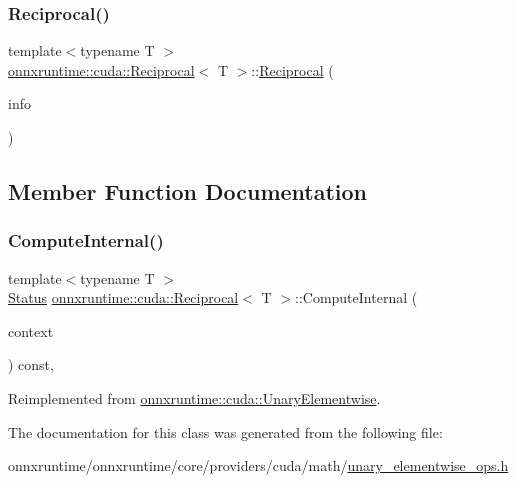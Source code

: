 \subsubsection{\texorpdfstring{Reciprocal()}{Reciprocal()}}
{\footnotesize\ttfamily template$<$typename T $>$ \\
\mbox{\hyperlink{classonnxruntime_1_1cuda_1_1Reciprocal}{onnxruntime\+::cuda\+::\+Reciprocal}}$<$ T $>$\+::\mbox{\hyperlink{classonnxruntime_1_1cuda_1_1Reciprocal}{Reciprocal}} (\begin{DoxyParamCaption}\item[{const \mbox{\hyperlink{classonnxruntime_1_1OpKernelInfo}{Op\+Kernel\+Info}} \&}]{info }\end{DoxyParamCaption})\hspace{0.3cm}{\ttfamily [inline]}}



\subsection{Member Function Documentation}
\mbox{\label{classonnxruntime_1_1cuda_1_1Reciprocal_aa4aef164f01dedd8969d326ab2f37a0d}} 
\subsubsection{\texorpdfstring{Compute\+Internal()}{ComputeInternal()}}
{\footnotesize\ttfamily template$<$typename T $>$ \\
\mbox{\hyperlink{classonnxruntime_1_1common_1_1Status}{Status}} \mbox{\hyperlink{classonnxruntime_1_1cuda_1_1Reciprocal}{onnxruntime\+::cuda\+::\+Reciprocal}}$<$ T $>$\+::Compute\+Internal (\begin{DoxyParamCaption}\item[{\mbox{\hyperlink{classonnxruntime_1_1OpKernelContext}{Op\+Kernel\+Context}} $\ast$}]{context }\end{DoxyParamCaption}) const\hspace{0.3cm}{\ttfamily [override]}, {\ttfamily [virtual]}}



Reimplemented from \mbox{\hyperlink{classonnxruntime_1_1cuda_1_1UnaryElementwise_abbbcb29c3937e2ac9e2ad768d9c69fca}{onnxruntime\+::cuda\+::\+Unary\+Elementwise}}.



The documentation for this class was generated from the following file\+:\begin{DoxyCompactItemize}
\item 
onnxruntime/onnxruntime/core/providers/cuda/math/\mbox{\hyperlink{unary__elementwise__ops_8h}{unary\+\_\+elementwise\+\_\+ops.\+h}}\end{DoxyCompactItemize}

